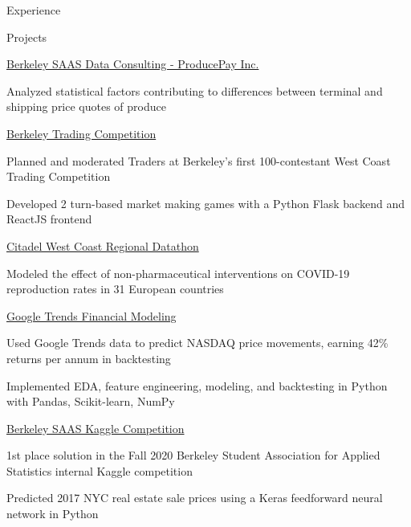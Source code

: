 \documentclass{resume} %
\begin{document}
\begin{rSection}{Experience}
\end{rSection}


\begin{rSection}{Projects}

\begin{rSubsection}{\href{https://www.producepay.com/}{Berkeley SAAS Data Consulting - ProducePay Inc.}}{}{}{}
    \item Analyzed statistical factors contributing to differences between terminal and shipping price quotes of produce
\end{rSubsection}

\begin{rSubsection}{\href{https://traders.berkeley.edu/}{Berkeley Trading Competition}}{}{}{}
    \item Planned and moderated Traders at Berkeley's first 100-contestant West Coast Trading Competition
    \item Developed 2 turn-based market making games with a Python Flask backend and ReactJS frontend 
\end{rSubsection}

\begin{rSubsection}{\href{https://github.com/evilpegasus/datathon-spring-2021}{Citadel West Coast Regional Datathon}}{}{}{}
    \item Modeled the effect of non-pharmaceutical interventions on COVID-19 reproduction rates in 31 European countries
\end{rSubsection}

\begin{rSubsection}{\href{https://github.com/evilpegasus/google-trends-financial-modeling/}{Google Trends Financial Modeling}}{}{}{}
    \item Used Google Trends data to predict NASDAQ price movements, earning 42\% returns per annum in backtesting
    \item Implemented EDA, feature engineering, modeling, and backtesting in Python with Pandas, Scikit-learn, NumPy
\end{rSubsection}

\begin{rSubsection}{\href{https://www.kaggle.com/c/saas-2020-fall-cx-kaggle-compeition/}{Berkeley SAAS Kaggle Competition}}{}{}{}
    \item 1st place solution in the Fall 2020 Berkeley Student Association for Applied Statistics internal Kaggle competition
    \item Predicted 2017 NYC real estate sale prices using a Keras feedforward neural network in Python
\end{rSubsection}


\end{rSection}
\end{document}
